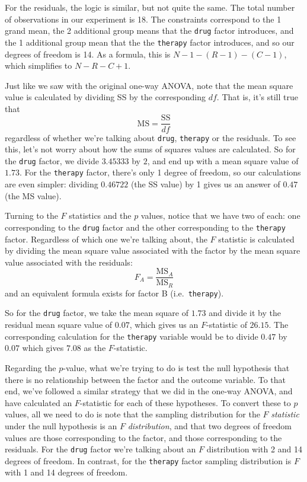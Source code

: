 \documentclass[
  11pt,
  a4paper,
  twoside,symmetric,openright]{book}
\theoremstyle{break}
\theoremstyle{break}
\begin{document}
For the residuals, the logic is similar, but not quite the same. The total number of observations in our experiment is 18. The constraints correspond to the 1 grand mean, the 2 additional group means that the \texttt{drug} factor introduces, and the 1 additional group mean that the the \texttt{therapy} factor introduces, and so our degrees of freedom is 14. As a formula, this is \(N-1 -(R-1)-(C-1)\), which simplifies to \(N-R-C+1\).

Just like we saw with the original one-way ANOVA, note that the mean square value is calculated by dividing SS by the corresponding \(df\). That is, it's still true that
\[
\mbox{MS} = \frac{\mbox{SS}}{df}
\]
regardless of whether we're talking about \texttt{drug}, \texttt{therapy} or the residuals. To see this, let's not worry about how the sums of squares values are calculated. So for the \texttt{drug} factor, we divide \(3.45333\) by \(2\), and end up with a mean square value of \(1.73\). For the \texttt{therapy} factor, there's only 1 degree of freedom, so our calculations are even simpler: dividing \(0.46722\) (the SS value) by 1 gives us an answer of \(0.47\) (the MS value).

Turning to the \(F\) statistics and the \(p\) values, notice that we have two of each: one corresponding to the \texttt{drug} factor and the other corresponding to the \texttt{therapy} factor. Regardless of which one we're talking about, the \(F\) statistic is calculated by dividing the mean square value associated with the factor by the mean square value associated with the residuals:
\[
F_{A} = \frac{\mbox{MS}_{A}}{\mbox{MS}_{R}}
\]
and an equivalent formula exists for factor B (i.e.~\texttt{therapy}).

So for the \texttt{drug} factor, we take the mean square of \(1.73\) and divide it by the residual mean square value of \(0.07\), which gives us an \(F\)-statistic of \(26.15\). The corresponding calculation for the \texttt{therapy} variable would be to divide \(0.47\) by \(0.07\) which gives \(7.08\) as the \(F\)-statistic.

Regarding the \(p\)-value, what we're trying to do is test the null hypothesis that there is no relationship between the factor and the outcome variable. To that end, we've followed a similar strategy that we did in the one-way ANOVA, and have calculated an \(F\)-statistic for each of these hypotheses. To convert these to \(p\) values, all we need to do is note that the sampling distribution for the \(F\) \emph{statistic} under the null hypothesis is an \(F\) \emph{distribution}, and that two degrees of freedom values are those corresponding to the factor, and those corresponding to the residuals. For the \texttt{drug} factor we're talking about an \(F\) distribution with 2 and 14 degrees of freedom. In contrast, for the \texttt{therapy} factor sampling distribution is \(F\) with 1 and 14 degrees of freedom.
\end{document}
